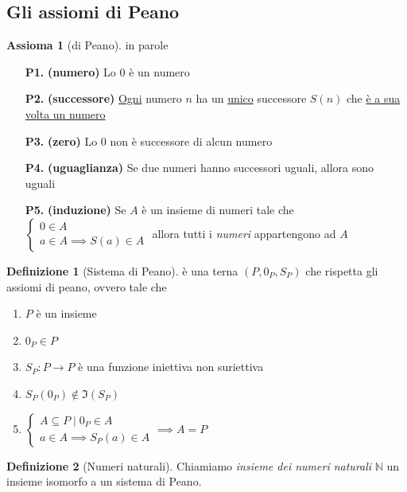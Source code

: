 \documentclass[a4paper,10pt]{article}
\theoremstyle{definition}
\theoremstyle{indentdefinition}
\newtheorem{defn}{Definizione}[section]
\theoremstyle{indentpostulate}
\newtheorem{axiom}{Assioma}[section]
\theoremstyle{indenttheorem}
\theoremstyle{myremark}
\theoremstyle{indentgeneral}
\begin{document}
\subsection{Gli assiomi di Peano}
\begin{axiom}[di Peano] in parole
\begin{itemize}
    \item[\textbf{P1.}] \textbf{(numero)} Lo 0 è un numero
    \item[\textbf{P2.}] \textbf{(successore) }\underline{Ogni} numero $n$ ha un \underline{unico} successore $S(n)$ che  \underline{è a sua volta un numero}
    \item[\textbf{P3.}] \textbf{(zero)} Lo 0 non è successore di alcun numero
    \item[\textbf{P4.}] \textbf{(uguaglianza)} Se due numeri hanno successori uguali, allora sono uguali
    \item[\textbf{P5.}] \textbf{(induzione)} Se $A$ è un insieme di numeri tale che $\begin{cases}
    0\in A \\
    a\in A\implies S(a)\in A
    \end{cases}$ allora tutti i \textit{numeri} appartengono ad $A$
\end{itemize}
\end{axiom}

\begin{defn}[Sistema di Peano] è una terna $(P,0_P,S_P)$ che rispetta gli assiomi di peano, ovvero tale che
\begin{enumerate}
    \item $P$ è un insieme
    \item $0_P\in P$\
    \item $S_P:P\to P$ è una funzione iniettiva non suriettiva
    \item $S_P(0_P)\notin \Im(S_P)$
    \item $\begin{cases}
        A\subseteq P \mid 0_P\in A\\
        a\in A\implies S_P(a)\in A
    \end{cases}\implies A=P$
\end{enumerate}   
\end{defn}

\begin{defn}[Numeri naturali]
    Chiamiamo \textit{insieme dei numeri naturali} $\mathbb{N}$ un insieme isomorfo a un sistema di Peano.
\end{defn}
\end{document}
